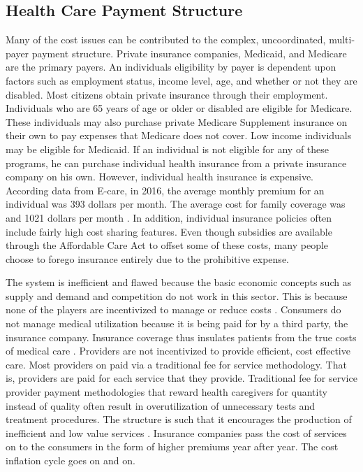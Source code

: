 \documentclass[sigconf]{acmart}
\begin{document}
\subsection{Health Care Payment Structure}
Many of the cost issues can be contributed to the complex, uncoordinated, multi-payer payment structure. Private insurance companies, Medicaid, and Medicare are the primary payers.  An individuals eligibility by payer is dependent upon factors such as employment status, income level, age, and whether or not they are disabled.  Most citizens obtain private insurance through their employment. Individuals who are 65 years of age or older or disabled are eligible for Medicare. These individuals may also purchase private Medicare Supplement insurance on their own to pay expenses that Medicare does not cover. Low income individuals may be eligible for Medicaid. If an individual is not eligible for any of these programs, he can purchase individual health insurance from a private insurance company on his own.  However, individual health insurance is expensive.  According data from E-care, in 2016, the average monthly premium for an individual was 393 dollars per month. The average cost for family coverage was and 1021 dollars per month \cite{www-google-cost}. In addition, individual insurance policies often include fairly high cost sharing features. Even though subsidies are available through the Affordable Care Act to offset some of these costs, many people choose to forego insurance entirely due to the prohibitive expense.


The system is inefficient and flawed because the basic economic concepts such as supply and demand and competition do not work in this sector. This is because none of the players are incentivized to manage or reduce costs \cite{milbank}.  Consumers do not manage medical utilization because it is being paid for by a third party, the insurance company.  Insurance coverage thus insulates patients from the true costs of medical care \cite{milbank}. Providers are not incentivized to provide efficient, cost effective care. Most providers on paid via a traditional fee for service methodology. That is, providers are paid for each service that they provide. Traditional fee for service provider payment methodologies that reward health caregivers for quantity instead of quality often result in overutilization of unnecessary tests and treatment procedures.  The structure is such that it encourages the production of inefficient and low value services \cite{milbank}.  Insurance companies pass the cost of services on to the consumers in the form of higher premiums year after year. The cost inflation cycle goes on and on.  
\end{document}
